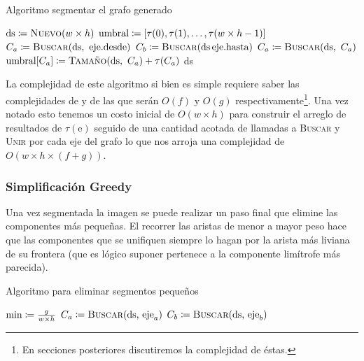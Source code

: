 \begin{algorithm}[H]
\caption{Algoritmo segmentar el grafo generado}
\begin{algorithmic}[1]
\Statex{}
	\State{} $\text{ds} \is \Call{Nuevo}{w \times h}$
	\State{} $\text{umbral} \coloneqq [\tau(0), \tau(1), \dots, \tau(w \times h - 1)]$
		\State{} $C_a \is \Call{Buscar}{\text{ds},\ \text{eje}.\text{desde}}$
		\State{} $C_b \is \Call{Buscar}{\text{ds}\, \text{eje}.\text{hasta}}$
			\State{} 
			\State{} $C_a \is \Call{Buscar}{\text{ds},\ C_a}$
			\State{} $\text{umbral}[C_a] \is \Call{Tamaño}{\text{ds},\ C_a}
				+ \tau(C_a)$
		\EndIf{}
	\EndFor{}
	\State{} \Return{} ds
\EndFunction{}
\end{algorithmic}
\end{algorithm}

La complejidad de este algoritmo si bien es simple requiere saber las
complejidades de  y de  las que
serán $O(f)$ y $O(g)$ respectivamente\footnote{En secciones posteriores
discutiremos la complejidad de éstas.}. Una vez notado esto tenemos un costo
inicial de $O(w \times h)$ para construir el arreglo de resultados de
$\tau(\text{e})$ seguido de una cantidad acotada de llamadas a \textsc{Buscar}
y \textsc{Unir} por cada eje del grafo lo que nos arroja una complejidad de
$O(w \times h \times (f + g))$.

\subsubsection{Simplificación Greedy}

Una vez segmentada la imagen se puede realizar un paso final que elimine las
componentes más pequeñas. El recorrer las aristas de menor a mayor peso hace
que las componentes que se unifiquen siempre lo hagan por la arista más liviana
de su frontera (que es lógico suponer pertenece a la componente limítrofe más
parecida).

\begin{algorithm}[H]
\caption{Algoritmo para eliminar segmentos pequeños}
\begin{algorithmic}[1]
\Statex{}
	\State{} $\text{min} \coloneqq \frac{g}{w \times h}$
			\State{} $C_a \is \Call{Buscar}{\text{ds, eje}_a}$
			\State{} $C_b \is \Call{Buscar}{\text{ds, eje}_b}$
				\State{} 
			\EndIf{}
		\EndIf{}
	\EndFor{}
\EndFunction{}
\end{algorithmic}
\end{algorithm}

